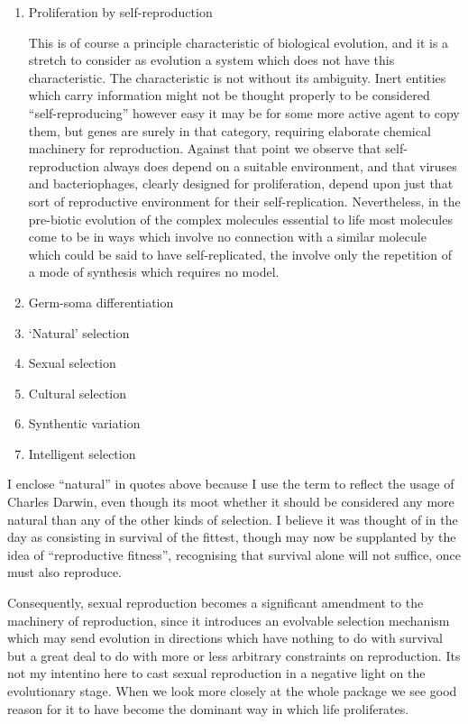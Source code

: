 \begin{enumerate}
\item Proliferation by self-reproduction

  This is of course a principle characteristic of biological evolution, and it is a stretch to consider as evolution a system which does not have this characteristic.
  The characteristic is not without its ambiguity.
  Inert entities which carry information might not be thought properly to be considered ``self-reproducing'' however easy it may be for some more active agent to copy them, but genes are surely in that category, requiring elaborate chemical machinery for reproduction.
  Against that point we observe that self-reproduction always does depend on a suitable environment, and that viruses and bacteriophages, clearly designed for proliferation, depend upon just that sort of reproductive environment for their self-replication.
  Nevertheless, in the pre-biotic evolution of the complex molecules essential to life most molecules come to be in ways which involve no connection with a similar molecule which could be said to have self-replicated, the involve only the repetition of a mode of synthesis which requires no model.
  
\item Germ-soma differentiation
\item `Natural' selection
\item Sexual selection
\item Cultural selection
\item Synthentic variation
\item Intelligent selection
\end{enumerate}

 I enclose ``natural'' in quotes above because I use the term to reflect the usage of Charles Darwin, even though its moot whether it should be considered any more natural than any of the other kinds of selection.
 I believe it was thought of in the day as consisting in survival of the fittest, though may now be supplanted by the idea of  ``reproductive fitness'', recognising that survival alone will not suffice, once must also reproduce.

 Consequently, sexual reproduction becomes a significant amendment to the machinery of reproduction, since it introduces an evolvable selection mechanism which may send evolution in directions which have nothing to do with survival but a great deal to do with more or less arbitrary constraints on reproduction.
 Its not my intentino here to cast sexual reproduction in a negative light on the evolutionary stage.
 When we look more closely at the whole package we see good reason for it to have become the dominant way in which life proliferates.

